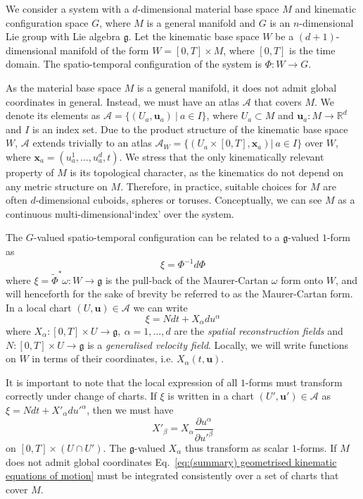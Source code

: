 We consider a system with a $d$-dimensional material base space $M$ and kinematic configuration space $G$, where $M$ is a general manifold and $G$ is an $n$-dimensional Lie group with Lie algebra $\mathfrak{g}$. Let the kinematic base space $W$ be a $(d+1)$-dimensional manifold of the form $W = [0, T] \times M$, where $[0, T]$ is the time domain. The spatio-temporal configuration of the system is $\Phi : W \to G$.

As the material base space $M$ is a general manifold, it does not admit global coordinates in general. Instead, we must have an atlas $\mathcal{A}$ that covers $M$. We denote its elements as $\mathcal{A} = \{ (U_a, \mathbf{u}_a)\ |\ a \in I \}$, where $U_a \subset M$ and $\mathbf{u}_a : M \to \mathbb{R}^d$ and $I$ is an index set. Due to the product structure of the kinematic base space $W$, $\mathcal{A}$ extends trivially to an atlas $\mathcal{A}_W = \{ (U_a \times [0, T], \mathbf{x}_a) |\ a \in I \}$ over $W$, where $\mathbf{x}_a = (u_a^1, \dots, u^d_a, t)$. We stress that the only kinematically relevant property of $M$ is its topological character, as the kinematics do not depend on any metric structure on $M$. Therefore, in practice, suitable choices for $M$ are often $d$-dimensional cuboids, spheres or toruses. Conceptually, we can see $M$ as a continuous multi-dimensional`index' over the system.

The $G$-valued spatio-temporal configuration can be related to a $\mathfrak{g}$-valued $1$-form as
\begin{equation} \label{eq:(summary) Phi from xi}
\xi = \Phi^{-1} d \Phi
\end{equation}
where $\xi = \tilde{\Phi}^* \omega : W \to \mathfrak{g}$ is the pull-back of the Maurer-Cartan $\omega$ form onto $W$, and will henceforth for the sake of brevity be referred to as the Maurer-Cartan form. In a local chart $(U, \mathbf{u}) \in \mathcal{A}$ we can write
\begin{equation} \label{eq:xi in basis}
\xi = N dt + X_\alpha d u^\alpha
\end{equation}
where $X_\alpha : [0, T] \times U \to \mathfrak{g},\ \alpha = 1,\dots,d$ are the \textit{spatial reconstruction fields} and $N : [0, T] \times U \to \mathfrak{g}$ is a \textit{generalised velocity field}. Locally, we will write functions on $W$ in terms of their coordinates, i.e. $X_\alpha(t, \mathbf{u})$.

It is important to note that the local expression of all $1$-forms must transform correctly under change of charts. If $\xi$ is written in a chart $(U', \mathbf{u}') \in \mathcal{A}$ as $\xi = N dt + X'_\alpha du'^\alpha$, then we must have
\begin{equation} \label{eq:X transformation rule}
X'_\beta = X_\alpha \frac{\partial u^\alpha}{\partial u'^\beta}
\end{equation}
on $[0, T] \times (U \cap U')$. The $\mathfrak{g}$-valued $X_\alpha$ thus transform as scalar $1$-forms. If $M$ does not admit global coordinates Eq.~\ref{eq:(summary) geometrised kinematic equations of motion} must be integrated consistently over a set of charts that cover $M$.

